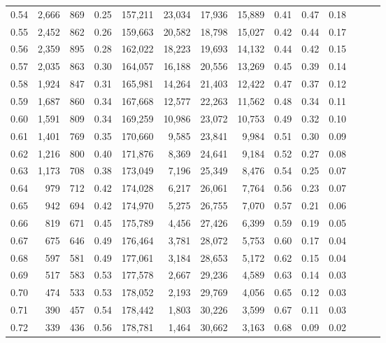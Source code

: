 \begin{tabular}{rrrrrrrrrrrrrr}
0.54 &  2,666 &  869 &  0.25 &  157,211 &   23,034 &  17,936 &  15,889 &  0.41 &  0.47 &      0.18 \\
0.55 &  2,452 &  862 &  0.26 &  159,663 &   20,582 &  18,798 &  15,027 &  0.42 &  0.44 &      0.17 \\
0.56 &  2,359 &  895 &  0.28 &  162,022 &   18,223 &  19,693 &  14,132 &  0.44 &  0.42 &      0.15 \\
0.57 &  2,035 &  863 &  0.30 &  164,057 &   16,188 &  20,556 &  13,269 &  0.45 &  0.39 &      0.14 \\
0.58 &  1,924 &  847 &  0.31 &  165,981 &   14,264 &  21,403 &  12,422 &  0.47 &  0.37 &      0.12 \\
0.59 &  1,687 &  860 &  0.34 &  167,668 &   12,577 &  22,263 &  11,562 &  0.48 &  0.34 &      0.11 \\
0.60 &  1,591 &  809 &  0.34 &  169,259 &   10,986 &  23,072 &  10,753 &  0.49 &  0.32 &      0.10 \\
0.61 &  1,401 &  769 &  0.35 &  170,660 &    9,585 &  23,841 &   9,984 &  0.51 &  0.30 &      0.09 \\
0.62 &  1,216 &  800 &  0.40 &  171,876 &    8,369 &  24,641 &   9,184 &  0.52 &  0.27 &      0.08 \\
0.63 &  1,173 &  708 &  0.38 &  173,049 &    7,196 &  25,349 &   8,476 &  0.54 &  0.25 &      0.07 \\
0.64 &    979 &  712 &  0.42 &  174,028 &    6,217 &  26,061 &   7,764 &  0.56 &  0.23 &      0.07 \\
0.65 &    942 &  694 &  0.42 &  174,970 &    5,275 &  26,755 &   7,070 &  0.57 &  0.21 &      0.06 \\
0.66 &    819 &  671 &  0.45 &  175,789 &    4,456 &  27,426 &   6,399 &  0.59 &  0.19 &      0.05 \\
0.67 &    675 &  646 &  0.49 &  176,464 &    3,781 &  28,072 &   5,753 &  0.60 &  0.17 &      0.04 \\
0.68 &    597 &  581 &  0.49 &  177,061 &    3,184 &  28,653 &   5,172 &  0.62 &  0.15 &      0.04 \\
0.69 &    517 &  583 &  0.53 &  177,578 &    2,667 &  29,236 &   4,589 &  0.63 &  0.14 &      0.03 \\
0.70 &    474 &  533 &  0.53 &  178,052 &    2,193 &  29,769 &   4,056 &  0.65 &  0.12 &      0.03 \\
0.71 &    390 &  457 &  0.54 &  178,442 &    1,803 &  30,226 &   3,599 &  0.67 &  0.11 &      0.03 \\
0.72 &    339 &  436 &  0.56 &  178,781 &    1,464 &  30,662 &   3,163 &  0.68 &  0.09 &      0.02 \\

\end{tabular}
